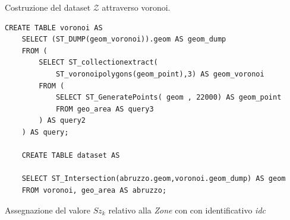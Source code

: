 \newpage
Costruzione del dataset $\mathcal{Z}$ attraverso voronoi.
\begin{lstlisting}[style = mystyle]
 CREATE TABLE voronoi AS
	SELECT (ST_DUMP(geom_voronoi)).geom AS geom_dump 
	FROM (
		SELECT ST_collectionextract(
			ST_voronoipolygons(geom_point),3) AS geom_voronoi
		FROM (
			SELECT ST_GeneratePoints( geom , 22000) AS geom_point
			FROM geo_area AS query3 
		) AS query2
	) AS query;

	CREATE TABLE dataset AS
	
	SELECT ST_Intersection(abruzzo.geom,voronoi.geom_dump) AS geom
	FROM voronoi, geo_area AS abruzzo;

\end{lstlisting}

\newpage
Assegnazione del valore $Sz_k$ relativo alla \textit{Zone} con con identificativo \textit{idc}

